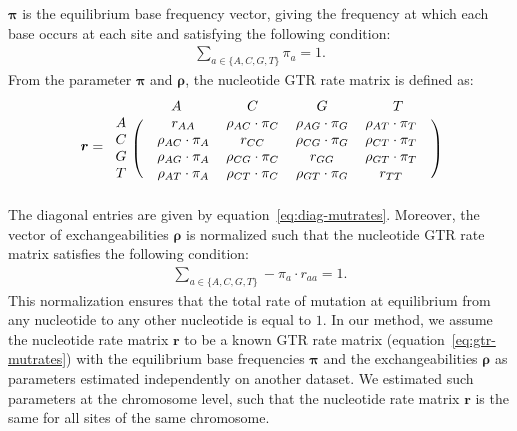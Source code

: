 \documentclass{article}
\newcommand{\Multiply}{\cdot}
\newcommand{\mutmatrix}{r}
\newcommand{\Mutmatrix}{\bm{\mutmatrix}}
\newcommand{\exchan}{\rho}
\newcommand{\Exchan}{\bm{\exchan}}
\newcommand{\mutequi}{\pi}
\newcommand{\Mutequi}{\bm{\mutequi}}
\begin{document}
    $\Mutequi$ is the equilibrium base frequency vector, giving the frequency at which each base occurs at each site and satisfying the following condition:
    \begin{align}
        \sum\limits_{a \in \{A, C, G, T\}} \mutequi_a = 1.
    \end{align}
    From the parameter $\Mutequi$ and $\Exchan$, the nucleotide GTR rate matrix is defined as:
    \begin{equation}
        \label{eq:gtr-mutrates}
        \Mutmatrix =
        \begin{blockarray}{ccccc}
            & A                                        & C                                        & G                                        & T                                        \\
            \begin{block}{c(cccc)}
                A & \quad \mutmatrix_{AA} \quad              & {\exchan_{AC}\Multiply \mutequi_C} \quad & {\exchan_{AG}\Multiply \mutequi_G} \quad & {\exchan_{AT}\Multiply \mutequi_T} \quad \\
                C & \quad {\exchan_{AC}\Multiply \mutequi_A} & \mutmatrix_{CC}                          & {\exchan_{CG}\Multiply \mutequi_G}       & {\exchan_{CT}\Multiply \mutequi_T} \quad \\
                G & \quad {\exchan_{AG}\Multiply \mutequi_A} & {\exchan_{CG}\Multiply \mutequi_C}       & \mutmatrix_{GG}                & {\exchan_{GT}\Multiply \mutequi_T} \quad \\
                T & \quad {\exchan_{AT}\Multiply \mutequi_A} & {\exchan_{CT}\Multiply \mutequi_C}       & {\exchan_{GT}\Multiply \mutequi_G}       & \mutmatrix_{TT}          \quad  \\
            \end{block}
        \end{blockarray}
    \end{equation}
    The diagonal entries are given by equation~\ref{eq:diag-mutrates}.
    Moreover, the vector of exchangeabilities $\Exchan$ is normalized such that the nucleotide GTR rate matrix satisfies the following condition:
    \begin{align}
        \sum\limits_{a \in \{A, C, G, T\}} - \mutequi_a \Multiply \mutmatrix_{aa} = 1.
    \end{align}
    This normalization ensures that the total rate of mutation at equilibrium from any nucleotide to any other nucleotide is equal to $1$.
    In our method, we assume the nucleotide rate matrix $\Mutmatrix$ to be a known GTR rate matrix (equation~\ref{eq:gtr-mutrates}) with the equilibrium base frequencies $\Mutequi$ and the exchangeabilities $\Exchan$ as parameters estimated independently on another dataset.
    We estimated such parameters at the chromosome level, such that the nucleotide rate matrix $\Mutmatrix$ is the same for all sites of the same chromosome.
\end{document}
